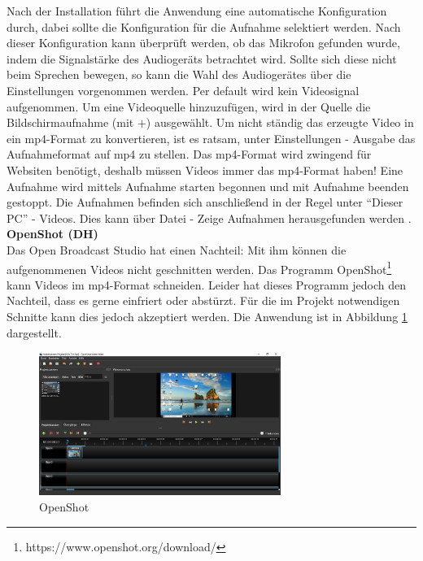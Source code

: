 Nach der Installation führt die Anwendung eine automatische Konfiguration durch, dabei sollte die Konfiguration für die Aufnahme selektiert werden. Nach dieser Konfiguration kann überprüft werden, ob das Mikrofon gefunden wurde, indem die Signalstärke des Audiogeräts betrachtet wird. Sollte sich diese nicht beim Sprechen bewegen, so kann die Wahl des Audiogerätes über die Einstellungen vorgenommen werden. Per default wird kein Videosignal aufgenommen. Um eine Videoquelle hinzuzufügen, wird in der Quelle die Bildschirmaufnahme (mit +) ausgewählt. Um nicht ständig das erzeugte Video in ein mp4-Format zu konvertieren, ist es ratsam, unter Einstellungen - Ausgabe das Aufnahmeformat auf mp4 zu stellen. Das mp4-Format wird zwingend für Websiten benötigt, deshalb müssen Videos immer das mp4-Format haben! Eine Aufnahme wird mittels Aufnahme starten begonnen und mit Aufnahme beenden gestoppt. Die Aufnahmen befinden sich anschließend in der Regel unter "`Dieser PC"' - Videos. Dies kann über Datei - Zeige Aufnahmen herausgefunden werden \cite[vgl.][]{OBS}. \bigskip \\
\textbf{OpenShot (DH)}\\
Das Open Broadcast Studio hat einen Nachteil: Mit ihm können die aufgenommenen Videos nicht geschnitten werden. Das Programm OpenShot\footnote{https://www.openshot.org/download/} kann Videos im mp4-Format schneiden. Leider hat dieses Programm jedoch den Nachteil, dass es gerne einfriert oder abstürzt. Für die im Projekt notwendigen Schnitte kann dies jedoch akzeptiert werden. Die Anwendung ist in Abbildung \ref{fig:OpenShot} dargestellt.
\begin{figure}[htb]
	\centering
		\includegraphics[width=0.70\textwidth]{figures/OpenShot.png}
	\caption{OpenShot}
	\label{fig:OpenShot}
\end{figure}
